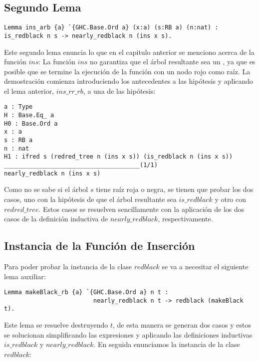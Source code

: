 \subsection{Segundo Lema}

\begin{verbatim}
Lemma ins_arb {a} `{GHC.Base.Ord a} (x:a) (s:RB a) (n:nat) :
is_redblack n s -> nearly_redblack n (ins x s).
\end{verbatim}

Este segundo lema enuncia lo que en el capitulo anterior se menciono acerca de la funci\'on $ins$:
La funci\'on $ins$ no garantiza que el \'arbol resultante sea un {\arn}, ya que es posible que se
termine la ejecuci\'on de la funci\'on con un nodo rojo como raíz. La demostraci\'on comienza
introduciendo los antecedentes a las hipótesis y aplicando el lema anterior, $ins\_rr\_rb$, a una
de las hip\'otesis:

\begin{verbatim}
a : Type
H : Base.Eq_ a
H0 : Base.Ord a
x : a
s : RB a
n : nat
H1 : ifred s (redred_tree n (ins x s)) (is_redblack n (ins x s))
______________________________________(1/1)
nearly_redblack n (ins x s)

\end{verbatim}

Como no se sabe si el \'arbol $s$ tiene ra\'iz roja o negra, se tienen que probar los dos casos,
uno con la hipótesis de que el \'arbol resultante sea $is\_redblack$ y otro con $redred\_tree$.
Estos casos se resuelven sencillamente con la aplicación de los dos casos de la definici\'on
inductiva de $nearly\_redblack$, respectivamente.

\subsection{Instancia de la Funci\'on de Inserci\'on}

Para poder probar la instancia de la clase $redblack$ se va a necesitar el siguiente lema auxiliar:

\begin{verbatim}
Lemma makeBlack_rb {a} `{GHC.Base.Ord a} n t :
                         nearly_redblack n t -> redblack (makeBlack t).
\end{verbatim}

Este lema se resuelve destruyendo $t$, de esta manera se generan dos casos y estos se solucionan
simplificando las expresiones y aplicando las definiciones inductivas $is\_redblack$ y
$nearly\_redblack$.
En seguida enunciamos la instancia de la clase $redblack$:

